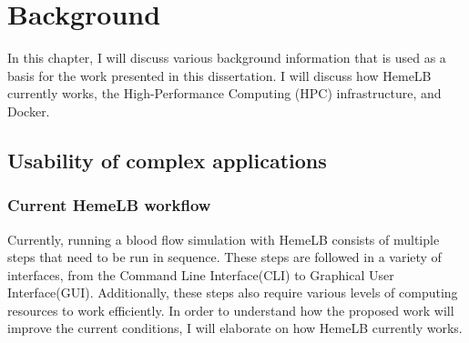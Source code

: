  

\chapter[Background]{Background}

In this chapter, I will discuss various background information that is used as a basis for the work presented in this dissertation. I will discuss how HemeLB currently works, the High-Performance Computing (HPC) infrastructure, and Docker.


\section{Usability of complex applications}

\subsection{Current HemeLB workflow}

Currently, running a blood flow simulation with HemeLB consists of multiple steps that need to be run in sequence. These steps are followed in a variety of interfaces, from the Command Line Interface(CLI) to Graphical User Interface(GUI). Additionally, these steps also require various levels of computing resources to work efficiently. In order to understand how the proposed work will improve the current conditions, I will elaborate on how HemeLB currently works.




\vspace{1cm}

\noindent%
\begin{minipage}{\linewidth}%
\label{fig:hemelb-workflow}%
\end{minipage}

